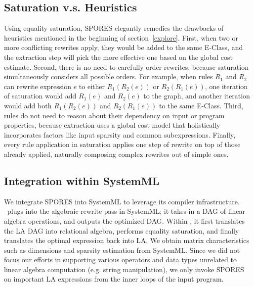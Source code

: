 \subsection{Saturation v.s. Heuristics}

Using equality saturation, SPORES elegantly remedies the drawbacks of
heuristics mentioned in the beginning of section~\ref{explore}. First, when two
or more conflicting rewrites apply, they would be added to the same E-Class, and
the extraction step will pick the more effective one based on the global cost
estimate. Second, there is no need to carefully order rewrites, because
saturation simultaneously considers all possible orders. For example, when rules
$R_1$ and $R_2$ can rewrite expression $e$ to either $R_1(R_2(e))$ or
$R_2(R_1(e))$, one iteration of saturation would add $R_1(e)$ and $R_2(e)$ to
the graph, and another iteration would add both $R_1(R_2(e))$ and $R_2(R_1(e))$
to the same E-Class. Third, rules do not need to reason about their dependency on
input or program properties, because extraction uses a global cost model that
holistically incorporates factors like input sparsity and common subexpressions.
Finally, every rule application in saturation applies one step of rewrite on top
of those already applied, naturally composing complex rewrites out of simple
ones.

\subsection{Integration within SystemML}

We integrate SPORES into SystemML to leverage its compiler
infrastructure. \sys\ plugs into the algebraic rewrite pass in SystemML; it
takes in a DAG of linear algebra operations, and outputs the optimized DAG.
Within \sys, it first translates the LA DAG into relational algebra,
performs equality saturation, and finally translates the optimal expression back
into LA. We obtain matrix characteristics such as dimensions and sparsity
estimation from SystemML. Since we did not focus our efforts in supporting
various operators and data types unrelated to linear algebra computation (e.g.
string manipulation), we only invoke SPORES on important LA expressions
from the inner loops of the input program.


